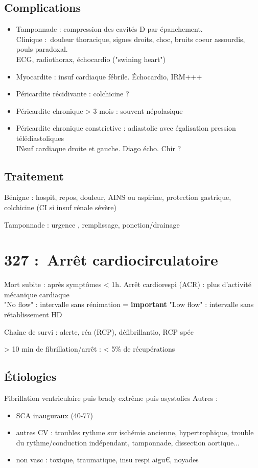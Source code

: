 \documentclass{article}
\begin{document}
\subsection{Complications}
\begin{itemize}
  \item Tamponnade : compression des cavités D par épanchement.\\
    Clinique : douleur thoracique, signes droits, choc, bruits coeur assourdis,
    pouls paradoxal. \\
    ECG, radiothorax, échocardio ("swining heart")
  \item Myocardite : insuf cardiaque fébrile. Échocardio, IRM+++
  \item Péricardite récidivante : colchicine ?
  \item Péricardite chronique > 3 mois : souvent népolasique
  \item Péricardite chronique constrictive : adiastolie avec égalisation
    pression télédiastoliques\\
    INsuf cardiaque droite et gauche. Diago écho. Chir ?
\end{itemize}

\subsection{Traitement}
Bénigne : hospit, repos, douleur, AINS ou aspirine, protection gastrique,
colchicine (CI si insuf rénale sévère)

Tamponnade : urgence \skull, remplissage, ponction/drainage

\section{327 : Arrêt cardiocirculatoire}%
\label{sec:327_arret_cardiocirculatoire}

Mort subite : après symptômes < 1h. Arrêt cardiorespi (ACR) : plus d'activité
mécanique cardiaque\\
"No flow" : intervalle sans rénimation = \textbf{important} 
"Low flow" : intervalle sans rétablissement HD

Chaîne de survi : alerte, réa (RCP), défibrillantio, RCP spéc

> 10 min de fibrillation/arrêt : < 5\% de récupérations

\subsection{Étiologies}
Fibrillation ventriculaire puis brady extrême puis asystolies
Autres :
\begin{itemize}
  \item SCA inauguraux (40-77\=)
  \item autres CV : troubles rythme sur ischémie ancienne, hypertrophique,
    trouble du rythme/conduction indépendant, tamponnade, dissection aortique...
  \item non vasc : toxique, traumatique, insu respi aigu€, noyades
\end{itemize}
\end{document}
